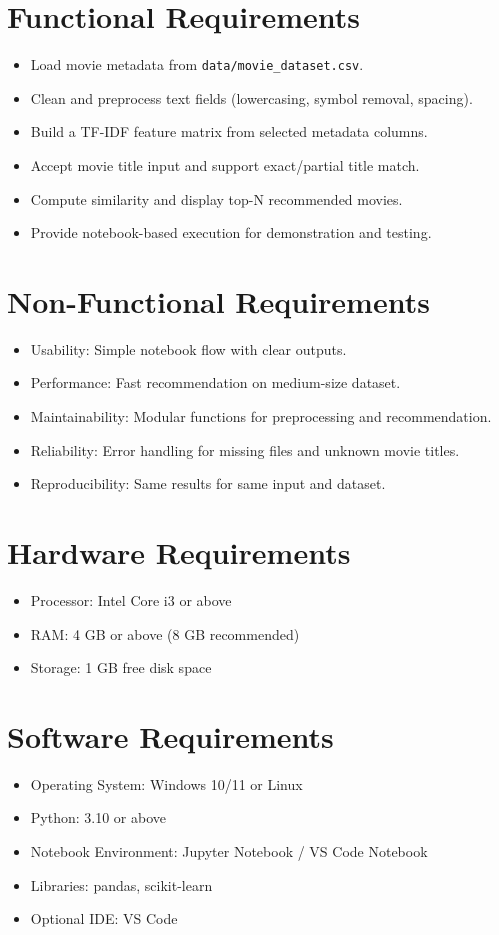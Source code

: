 \documentclass[12pt,a4paper]{report}
\begin{document}
\section{Functional Requirements}
\begin{itemize}[leftmargin=1.2cm]
\item Load movie metadata from \texttt{data/movie\_dataset.csv}.
\item Clean and preprocess text fields (lowercasing, symbol removal, spacing).
\item Build a TF-IDF feature matrix from selected metadata columns.
\item Accept movie title input and support exact/partial title match.
\item Compute similarity and display top-N recommended movies.
\item Provide notebook-based execution for demonstration and testing.
\end{itemize}

\section{Non-Functional Requirements}
\begin{itemize}[leftmargin=1.2cm]
\item Usability: Simple notebook flow with clear outputs.
\item Performance: Fast recommendation on medium-size dataset.
\item Maintainability: Modular functions for preprocessing and recommendation.
\item Reliability: Error handling for missing files and unknown movie titles.
\item Reproducibility: Same results for same input and dataset.
\end{itemize}

\section{Hardware Requirements}
\begin{itemize}[leftmargin=1.2cm]
\item Processor: Intel Core i3 or above
\item RAM: 4 GB or above (8 GB recommended)
\item Storage: 1 GB free disk space
\end{itemize}

\section{Software Requirements}
\begin{itemize}[leftmargin=1.2cm]
\item Operating System: Windows 10/11 or Linux
\item Python: 3.10 or above
\item Notebook Environment: Jupyter Notebook / VS Code Notebook
\item Libraries: pandas, scikit-learn
\item Optional IDE: VS Code
\end{itemize}
\end{document}
